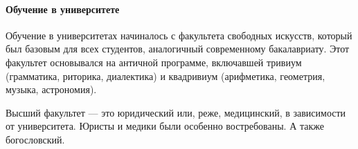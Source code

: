 \paragraph{Обучение в университете}

Обучение в университетах начиналось с факультета свободных искусств, который был базовым для всех студентов, аналогичный современному бакалавриату. Этот факультет основывался на античной программе, включавшей тривиум (грамматика, риторика, диалектика) и квадривиум (арифметика, геометрия, музыка, астрономия).




Высший факультет — это юридический или, реже, медицинский, в зависимости от университета. Юристы и медики были особенно востребованы. А также богословский.

